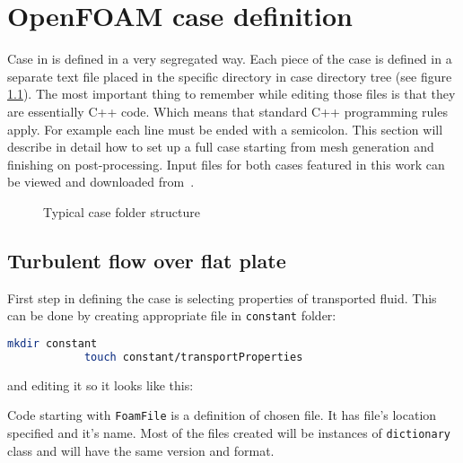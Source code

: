 \chapter{OpenFOAM case definition}
    Case in \oFoam is defined in a very segregated way. Each piece of the case is defined in a separate text file placed in the specific directory in case directory tree (see figure \ref{fig::ofoam_folders}). 
    The most important thing to remember while editing those files is that they are essentially C++ code.
    Which means that standard C++ programming rules apply. For example each line must be ended with a semicolon. This section will describe in detail how to set up a full \oFoam case starting from mesh generation and finishing on post-processing. Input files for both cases featured in this work can be viewed and downloaded from~\cite{git}.

    \begin{figure}[h]
      
    \caption{Typical \oFoam case folder structure}
    \label{fig::ofoam_folders}
    \end{figure}

    \section{Turbulent flow over flat plate}
        First step in defining the case is selecting properties of transported fluid.
        This can be done by creating appropriate file in \texttt{constant} folder:
        \begin{lstlisting}[language=bash]
            mkdir constant
            touch constant/transportProperties
        \end{lstlisting}
        and editing it so it looks like this:
        

        Code starting with \lstinline[language=C++]{FoamFile} is a definition of chosen file.
        It has file's location specified and it's name. Most of the files created will be instances of \lstinline[language=C++]{dictionary} class and will have the same version and format.

